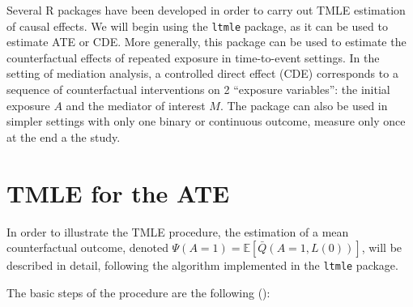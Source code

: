 \documentclass[
]{book}
\begin{document}
Several R packages have been developed in order to carry out TMLE estimation of causal effects. We will begin using the \texttt{ltmle} package, as it can be used to estimate ATE or CDE. More generally, this package can be used to estimate the counterfactual effects of repeated exposure in time-to-event settings. In the setting of mediation analysis, a controlled direct effect (CDE) corresponds to a sequence of counterfactual interventions on 2 ``exposure variables'': the initial exposure \(A\) and the mediator of interest \(M\). The package can also be used in simpler settings with only one binary or continuous outcome, measure only once at the end a the study.

\section{TMLE for the ATE}\label{tmle-for-the-ate}

In order to illustrate the TMLE procedure, the estimation of a mean counterfactual outcome, denoted \(\Psi(A=1) = \mathbb{E} \left[\bar{Q}(A=1,L(0))\right]\), will be described in detail, following the algorithm implemented in the \texttt{ltmle} package.

The basic steps of the procedure are the following ():
\end{document}
